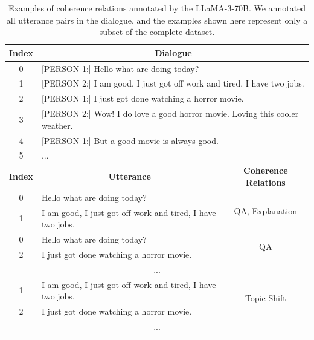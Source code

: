 \documentclass[letterpaper]{article} %
\begin{document}
\begin{table}[h]
\centering
\def\arraystretch{1.4}%
\begin{tabular}{|c|l|c|}
\hline

\rowcolor[RGB]{204,217,245}
\textbf{Index} & \multicolumn{2}{|c|}{\textbf{Dialogue}} \\
\hline

0 & \multicolumn{2}{|p{14cm}|}{[PERSON 1:] Hello what are doing today?} \\
\cline{1-1}
1 & \multicolumn{2}{|p{14cm}|}{[PERSON 2:] I am good, I just got off work and tired, I have two jobs.} \\
\cline{1-1}
2 & \multicolumn{2}{|p{14cm}|}{[PERSON 1:] I just got done watching a horror movie.} \\
\cline{1-1}
3 & \multicolumn{2}{|p{14cm}|}{[PERSON 2:] Wow! I do love a good horror movie. Loving this cooler weather.} \\
\cline{1-1}
4 & \multicolumn{2}{|p{14cm}|}{[PERSON 1:] But a good movie is always good.} \\
\cline{1-1}
5 & \multicolumn{2}{|p{14cm}|}{...} \\
\hline

\rowcolor[RGB]{204,217,245}
\textbf{Index} & \multicolumn{1}{|c|}{\textbf{Utterance}} & \textbf{Coherence Relations} \\
\hline

0 & Hello what are doing today? & \multirow{2}{*}{QA, Explanation} \\
\cline{1-2}
1 & I am good, I just got off work and tired, I have two jobs. & \\
\hline

0 & Hello what are doing today? & \multirow{2}{*}{QA} \\
\cline{1-2}
2 & I just got done watching a horror movie. & \\

\hline
\multicolumn{3}{|c|}{...} \\
\hline

1 & I am good, I just got off work and tired, I have two jobs. & \multirow{2}{*}{Topic Shift} \\
\cline{1-2}
2 & I just got done watching a horror movie. & \\
\hline

\multicolumn{3}{|c|}{...} \\
\hline

\end{tabular}
\caption{Examples of coherence relations annotated by the LLaMA-3-70B\protect\footnotemark\cite{llama3modelcard}. We annotated all utterance pairs in the dialogue, and the examples shown here represent only a subset of the complete dataset.}
\label{table:coherence-relations-annotated-example}
\end{table}
\end{document}
